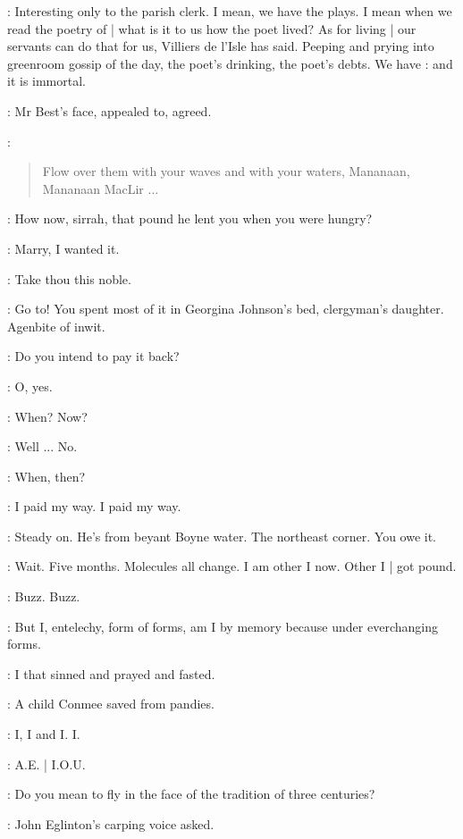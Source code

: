 \AErussell:
Interesting only to the parish clerk.
I mean,
we have the plays.
I mean when we read the poetry of  |
what is it to us how the poet lived?
As for living |
our servants can do that for us,
Villiers de l'Isle has said.
Peeping and prying into greenroom gossip of the day,
the poet's drinking,
the poet's debts.
We have :
and it is immortal.

:
Mr Best's face,
appealed to,
agreed.

\best:
\begin{verse}
    Flow over them with your waves and with your waters, Mananaan,
 \\
    Mananaan MacLir ...
\end{verse}

\StephenInt:
How now,
sirrah,
that pound he lent you when you were hungry?

\StephenInt:
Marry,
I wanted it.

\StephenInt:
Take thou this noble.

\StephenInt:
Go to!
You spent most of it in Georgina Johnson's bed,
clergyman's daughter.
Agenbite of inwit.

\StephenInt:
Do you intend to pay it back?

\StephenInt:
O, yes.

\StephenInt:
When?
Now?

\StephenInt:
Well ...
No.

\StephenInt:
When,
then?

\StephenInt:
I paid my way.
I paid my way.

\StephenInt:
Steady on.
He's from beyant Boyne water.
The northeast corner.
You owe it.

\StephenInt:
Wait.
Five months.
Molecules all change.
I am other I now.
Other I |
got pound.

\StephenInt:
Buzz.
Buzz.

\StephenInt:
But I,
entelechy,
form of forms,
am I by memory because under everchanging forms.

\StephenInt:
I that sinned and prayed and fasted.

\StephenInt:
A child Conmee saved from pandies.

\StephenInt:
I, I and I.
I.

\StephenInt:
A.E. |
I.O.U.

\eglinton:
Do you mean to fly in the face of the tradition of three centuries?

:
John Eglinton's carping voice asked.

